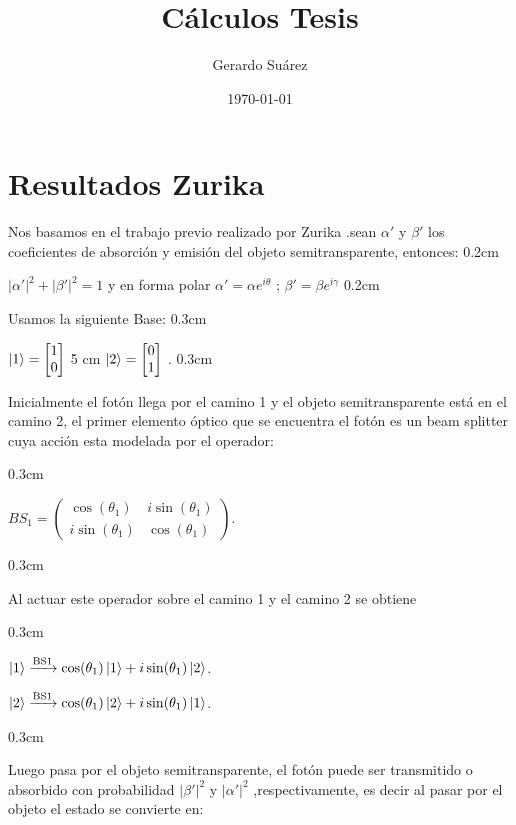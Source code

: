 \documentclass[11pt]{article}
\title
{\textbf
{Cálculos Tesis}}
\author
{Gerardo Suárez
}
\date{\small{\today}}
\begin{document}
\maketitle


\section
{Resultados Zurika
}

Nos basamos en el trabajo previo realizado por Zurika \cite{8} .sean $\alpha
'$ y $\beta'$ los coeficientes de absorción y emisión del objeto semitransparente, entonces:
\vspace
{0.2cm}

$|
\alpha
'|^2 + |\beta'|^2 = 1$  
y en forma polar   
$\alpha
'=\alpha
 e^
{i \theta}$ ; $\beta'=\beta e^
{i \gamma}$
\vspace
{0.2cm}

Usamos la siguiente Base:
\vspace
{0.3cm}


$\ket
{1}=\begin
{bmatrix} 1 \\0\end{bmatrix} $   
\hspace
{5 cm}   
$\ket
{2}=\begin
{bmatrix} 0\\1\end
{bmatrix}$ .
\vspace
{0.3cm}

Inicialmente el fotón llega por el camino 1 y el objeto semitransparente está en el camino 2, el primer elemento óptico que se encuentra el fotón es un beam splitter
 cuya acción esta modelada por el operador:

\vspace
{0.3cm}

$BS_
{1}=\begin
{pmatrix} \cos(\theta_
{1}) & i \sin(\theta_
{1}) \\ i \sin(\theta_
{1}) & \cos
(\theta_
{1}) \end
{pmatrix}$.

\vspace
{0.3cm}

Al actuar este operador sobre el camino 1 y el camino 2 se obtiene 

\vspace
{0.3cm}

$\ket{1}\xrightarrow{\text{BS1}}\cos(\theta_{1})\ket{1}+i\sin(\theta_{1})\ket{2}$.

$\ket
{2}\xrightarrow{\text{BS1}}\cos
(\theta_
{1})\ket
{2}+i\sin(\theta_
{1})\ket
{1}$.

\vspace
{0.3cm}

Luego pasa por el objeto semitransparente, el fotón puede ser transmitido o absorbido con probabilidad $|
\beta'|^2$ y $|
\alpha
'|^2$ ,respectivamente, es decir al pasar por el objeto el estado se convierte en:
\end{document}
